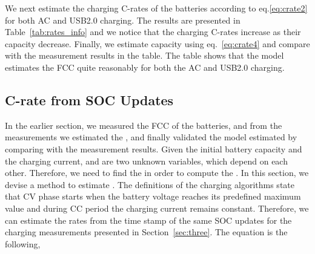 \documentclass[journal]{IEEEtran}
\begin{document}
We next estimate the charging C-rates of the batteries according to eq.\eqref{eq:crate2} for both AC and USB2.0 charging. The results are presented in Table~\ref{tab:rates_info} and we notice that the charging C-rates increase as their capacity decrease. Finally, we estimate capacity using eq.~\eqref{eq:crate4} and compare with the measurement results in the table. The table shows that the model estimates the FCC quite reasonably for both the AC and USB2.0 charging.







































\subsection{C-rate from SOC Updates}
\label{sub:battcrate}
In the earlier section, we measured the FCC of the batteries, and from the measurements we estimated the , and finally validated the model estimated by comparing with the measurement results. Given the initial battery capacity and the charging current,  and  are two unknown variables, which depend on each other. Therefore, we need to find the  in order to compute the . In this section, we devise a method to estimate . 
The definitions of the charging algorithms state that CV phase starts when the battery voltage reaches its predefined maximum value and during CC period the charging current remains constant.  Therefore, we can estimate the rates from the time stamp of the same SOC updates for the charging measurements presented in Section~\ref{sec:three}. The equation is the following, 
\end{document}
